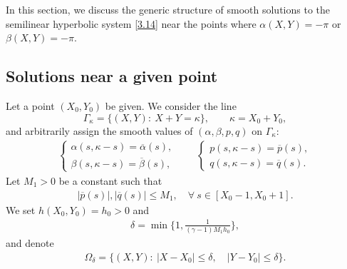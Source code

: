 \documentclass[11pt,reqno]{article}
\newcommand{\fr}{\frac}
\numberwithin{equation}{section}
\begin{document}
In this section, we discuss the generic structure of smooth solutions to the semilinear hyperbolic system \eqref{3.14} near the points where $\alpha(X,Y)=-\pi$ or $\beta(X,Y)=-\pi$.



\subsection{Solutions near a given point}\label{S41}

Let a point $(X_0,Y_0)$ be given. We consider the line
$$
\Gamma_\kappa=\Big\{(X,Y):\ X+Y=\kappa\Big\},\qquad \kappa=X_0+Y_0,
$$
and arbitrarily assign the smooth values of $(\alpha, \beta, p, q)$ on $\Gamma_\kappa$:
\begin{align}\label{4.1}
\left\{
\begin{array}{l}
\alpha(s,\kappa-s)=\overline{\alpha}(s), \\
\beta(s,\kappa-s)=\overline{\beta}(s),
\end{array}
\right.
\qquad
\left\{
\begin{array}{l}
p(s,\kappa-s)=\overline{p}(s), \\
q(s,\kappa-s)=\overline{q}(s).
\end{array}
\right.
\end{align}
Let $M_1>0$ be a constant such that
\begin{align}\label{4.2}
|\overline{p}(s)|,|\overline{q}(s)|\leq M_1, \quad \forall\ s\in[X_0-1, X_0+1].
\end{align}
We set $h(X_0,Y_0)=h_0>0$ and
\begin{align}\label{4.3}
\delta=\min\bigg\{1, \fr{1}{(\gamma-1)M_1h_0}\bigg\},
\end{align}
and denote
\begin{align}\label{4.4}
\Omega_\delta=\Big\{(X,Y):\ |X-X_0|\leq \delta,\quad |Y-Y_0|\leq \delta \Big\}.
\end{align}
\end{document}
